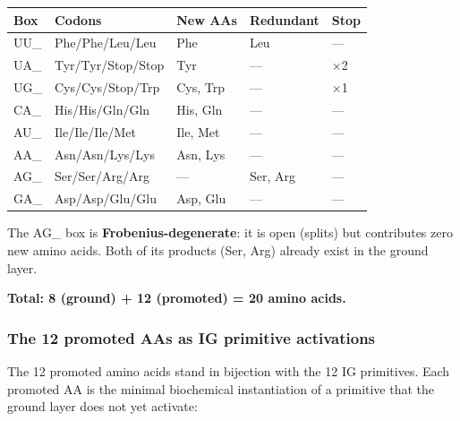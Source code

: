 \documentclass[12pt,a4paper]{article}
\begin{document}
\begin{table}[htbp]
\centering
\small
{}
\begin{tabularx}{\textwidth}{>{\centering\arraybackslash}X >{\centering\arraybackslash}X >{\centering\arraybackslash}X >{\centering\arraybackslash}X >{\centering\arraybackslash}X}
\toprule
\rowcolor{gray!25}\textbf{Box} & \textbf{Codons} & \textbf{New AAs} & \textbf{Redundant} & \textbf{Stop} \\
\midrule
\rowcolors{1}{white}{gray!10}
UU\_ & Phe/Phe/Leu/Leu & Phe & Leu & --- \\
UA\_ & Tyr/Tyr/Stop/Stop & Tyr & --- & $\times$2 \\
UG\_ & Cys/Cys/Stop/Trp & Cys, Trp & --- & $\times$1 \\
CA\_ & His/His/Gln/Gln & His, Gln & --- & --- \\
AU\_ & Ile/Ile/Ile/Met & Ile, Met & --- & --- \\
AA\_ & Asn/Asn/Lys/Lys & Asn, Lys & --- & --- \\
AG\_ & Ser/Ser/Arg/Arg & --- & Ser, Arg & --- \\
GA\_ & Asp/Asp/Glu/Glu & Asp, Glu & --- & --- \\
\bottomrule
\end{tabularx}
\end{table}

The AG\_ box is \textbf{Frobenius-degenerate}: it is open (splits) but contributes zero new
amino acids. Both of its products (Ser, Arg) already exist in the ground layer.

\textbf{Total: 8 (ground) + 12 (promoted) = 20 amino acids.}

\subsubsection{The 12 promoted AAs as IG primitive activations}

The 12 promoted amino acids stand in bijection with the 12 IG primitives.
Each promoted AA is the minimal biochemical instantiation of a primitive that the
ground layer does not yet activate:
\end{document}
